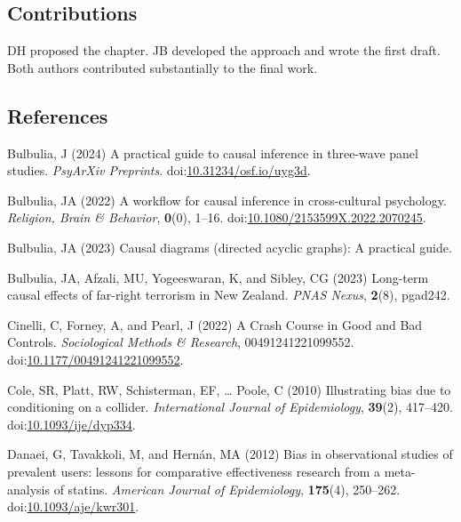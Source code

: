 \documentclass[
  singlecolumn]{article}
\newlength{\cslhangindent}
\newenvironment{CSLReferences}[2] %
 {\begin{list}{}{%
  \setlength{\itemindent}{0pt}
  \setlength{\leftmargin}{0pt}
  \setlength{\parsep}{0pt}
  \ifodd #1
   \setlength{\leftmargin}{\cslhangindent}
   \setlength{\itemindent}{-1\cslhangindent}
  \fi
  \setlength{\itemsep}{#2\baselineskip}}}
 {\end{list}}
\begin{document}
\subsection{Contributions}\label{contributions}

DH proposed the chapter. JB developed the approach and wrote the first
draft. Both authors contributed substantially to the final work.

\subsection{References}\label{references}

\label{refs}
\begin{CSLReferences}{1}{0}
Bulbulia, J (2024) A practical guide to causal inference in three-wave
panel studies. \emph{PsyArXiv Preprints}.
doi:\href{https://doi.org/10.31234/osf.io/uyg3d}{10.31234/osf.io/uyg3d}.

Bulbulia, JA (2022) A workflow for causal inference in cross-cultural
psychology. \emph{Religion, Brain \& Behavior}, \textbf{0}(0), 1--16.
doi:\href{https://doi.org/10.1080/2153599X.2022.2070245}{10.1080/2153599X.2022.2070245}.

Bulbulia, JA (2023) Causal diagrams (directed acyclic graphs): A
practical guide.

Bulbulia, JA, Afzali, MU, Yogeeswaran, K, and Sibley, CG (2023)
Long-term causal effects of far-right terrorism in {N}ew {Z}ealand.
\emph{PNAS Nexus}, \textbf{2}(8), pgad242.

Cinelli, C, Forney, A, and Pearl, J (2022) A Crash Course in Good and
Bad Controls. \emph{Sociological Methods \& Research},
00491241221099552.
doi:\href{https://doi.org/10.1177/00491241221099552}{10.1177/00491241221099552}.

Cole, SR, Platt, RW, Schisterman, EF, \ldots{} Poole, C (2010)
Illustrating bias due to conditioning on a collider. \emph{International
Journal of Epidemiology}, \textbf{39}(2), 417--420.
doi:\href{https://doi.org/10.1093/ije/dyp334}{10.1093/ije/dyp334}.

Danaei, G, Tavakkoli, M, and Hernán, MA (2012) Bias in observational
studies of prevalent users: lessons for comparative effectiveness
research from a meta-analysis of statins. \emph{American Journal of
Epidemiology}, \textbf{175}(4), 250--262.
doi:\href{https://doi.org/10.1093/aje/kwr301}{10.1093/aje/kwr301}.


\end{CSLReferences}
\end{document}
